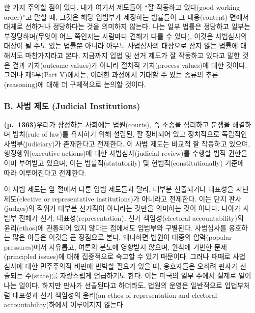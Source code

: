 \documentclass[a4paper,12pt,oneside]{article}  %
\begin{document}
한 가지 주의할 점이 있다. 내가 여기서 제도들이 ``잘 작동하고 있다(good
working order)''고 말할 때, 그것은 해당 입법부가 제정하는 법률들이 그
내용(content) 면에서 대체로 선하거나 정당하다는 것을 의미하지 않는다.
나는 일부 법률은 정당하고 일부는 부정당하며(무엇이 어느 쪽인지는
사람마다 견해가 다를 수 있다), 이것은 사법심사의 대상이 될 수도 있는
법률뿐 아니라 아무도 사법심사의 대상으로 삼지 않는 법률에 대해서도
마찬가지라고 본다. 지금까지 입법 및 선거 제도가 잘 작동하고 있다고 말한
것은 결과 가치(outcome values)가 아니라 절차적 가치(process values)에
대한 것이다. 그러나 제5부(Part V)에서는, 이러한 과정에서 기대할 수 있는
종류의 추론(reasoning)에 대해 더 구체적으로 논의할 것이다.

\subsubsection{B. 사법 제도 (Judicial
Institutions)}\label{b.-uxc0acuxbc95-uxc81cuxb3c4-judicial-institutions}

\textbf{(p.~1363)}우리가 상정하는 사회에는 법원(courts), 즉 소송을
심리하고 분쟁을 해결하며 법치(rule of law)를 유지하기 위해 설립된, 잘
정비되어 있고 정치적으로 독립적인 사법부(judiciary)가 존재한다고
전제한다. 이 사법 제도는 비교적 잘 작동하고 있으며, 행정행위(executive
actions)에 대한 사법심사(judicial review)를 수행할 법적 권한을 이미
부여받고 있으며, 이는 법률적(statutorily) 및 헌법적(constitutionally)
기준에 따라 이루어진다고 전제한다.

이 사법 제도는 앞 절에서 다룬 입법 제도들과 달리, 대부분 선출되거나
대표성을 지닌 제도(elective or representative institutions)가 아니라고
전제한다. 이는 단지 판사(judges)의 직위가 대부분 선거직이 아니라는
것만을 의미하는 것이 아니다. 나아가 사법부 전체가 선거,
대표성(representation), 선거 책임성(electoral accountability)의
윤리(ethos)에 관통되어 있지 않다는 점에서도 입법부와 구별된다.
사법심사를 옹호하는 많은 이들은 이것을 큰 장점으로 본다. 왜냐하면 법원이
대중의 압력(popular pressures)에서 자유롭고, 여론의 분노에 영향받지
않으며, 원칙에 기반한 문제(principled issues)에 대해 집중적으로 숙고할
수 있기 때문이다. 그러나 때때로 사법심사에 대한 민주주의적 비판에 반박할
필요가 있을 때, 옹호자들은 오히려 판사가 선출되는 주(state)를 자랑스럽게
언급하기도 한다. 이는 미국의 일부 주에서 실제로 일어나는 일이다. 하지만
판사가 선출된다고 하더라도, 법원의 운영은 일반적으로 입법부처럼 대표성과
선거 책임성의 윤리(an ethos of representation and electoral
accountability)하에서 이루어지지 않는다.
\end{document}
